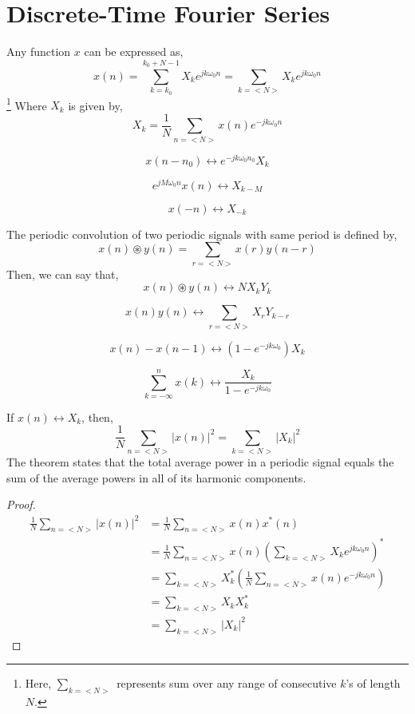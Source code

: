 		\section{Discrete-Time Fourier Series}
		Any function $x$ can be expressed as,
		\[x(n)=\sum\limits_{k=k_0}^{k_0+N-1}X_ke^{jk\omega_0 n}=\sum\limits_{k=<N>}X_ke^{jk\omega_0 n}\]\footnote{Here, $\sum\limits_{k=<N>}$ represents sum over any range of consecutive $k$'s of length $N$.}
		Where $X_k$ is given by,
		\[X_k=\frac{1}{N}\sum\limits_{n=<N>}x(n)e^{-jk\omega_0 n}\]
		\begin{theorem}
			\[x(n-n_0) \leftrightarrow e^{-jk\omega_0 n_0}X_k\]
		\end{theorem}
		\begin{theorem}
			\[e^{jM\omega_0 n}x(n)\leftrightarrow X_{k-M}\]
		\end{theorem}
		\begin{theorem}
			\[x(-n)\leftrightarrow X_{-k}\]
		\end{theorem}
		\begin{theorem}
			The periodic convolution of two periodic signals with same period is defined by,
			\[x(n)\circledast y(n)=\sum\limits_{r=<N>} x(r)y(n-r)\]
			Then, we can say that,
			\[x(n)\circledast y(n) \leftrightarrow NX_kY_k\]
		\end{theorem}
		\begin{theorem}[Multiplication]
			\[x(n)y(n)\leftrightarrow \sum\limits_{r=<N>} X_rY_{k-r}\]
		\end{theorem}
		\begin{theorem}
			\[x(n)-x(n-1)\leftrightarrow (1-e^{-jk\omega_0})X_k\]
		\end{theorem}
		\begin{theorem}
			\[\sum\limits_{k=-\infty}^n x(k) \leftrightarrow \frac{X_k}{1-e^{-jk\omega_0}}\]
		\end{theorem}
			\begin{theorem}
			If $x(n)\leftrightarrow X_k$, then,
			\[\frac{1}{N}\sum\limits_{n=<N>} |x(n)|^2=\sum\limits_{k=<N>}|X_k|^2\]
			The theorem states that the total average power in a periodic signal equals the sum of the average powers in all of its harmonic components.
		\end{theorem}
		\begin{proof}
			\[\begin{split}
				\frac{1}{N}\sum\limits_{n=<N>} |x(n)|^2&=\frac{1}{N}\sum\limits_{n=<N>} x(n)x^*(n)\\
				&=\frac{1}{N}\sum\limits_{n=<N>} x(n)\left(\sum\limits_{k=<N>}X_ke^{jk\omega_0n}\right)^*\\
				&=\sum\limits_{k=<N>}X^*_k\left(\frac{1}{N}\sum\limits_{n=<N>}x(n)e^{-jk\omega_0n}\right)\\
				&=\sum\limits_{k=<N>}X_kX^*_k\\
				&=\sum\limits_{k=<N>}|X_k|^2
			\end{split}\]
		\end{proof}
